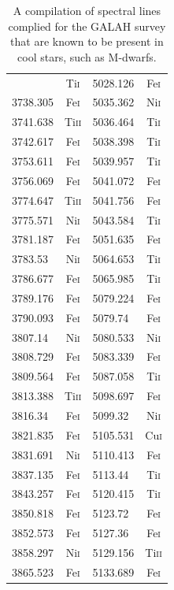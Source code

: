 \begin{longtable}[c]{|l|c|l|c|}
     \hline
     \caption{A compilation of spectral lines complied for the GALAH survey that are known to be present in cool stars, such as M-dwarfs.}
    \label{tabLineList}
    \endlastfoot
3729.807 & Ti\textsc{i} & 5028.126 & Fe\textsc{i}\\  
3738.305 & Fe\textsc{i} & 5035.362 & Ni\textsc{i}\\  
3741.638 & Ti\textsc{ii} & 5036.464 & Ti\textsc{i}\\ 
3742.617 & Fe\textsc{i} & 5038.398 & Ti\textsc{i}\\  
3753.611 & Fe\textsc{i} & 5039.957 & Ti\textsc{i}\\  
3756.069 & Fe\textsc{i} & 5041.072 & Fe\textsc{i}\\  
3774.647 & Ti\textsc{ii} & 5041.756 & Fe\textsc{i}\\ 
3775.571 & Ni\textsc{i} & 5043.584 & Ti\textsc{i}\\  
3781.187 & Fe\textsc{i} & 5051.635 & Fe\textsc{i}\\  
3783.53 & Ni\textsc{i} & 5064.653 & Ti\textsc{i}\\   
3786.677 & Fe\textsc{i} & 5065.985 & Ti\textsc{i}\\  
3789.176 & Fe\textsc{i} & 5079.224 & Fe\textsc{i}\\  
3790.093 & Fe\textsc{i} & 5079.74 & Fe\textsc{i}\\   
3807.14 & Ni\textsc{i} & 5080.533 & Ni\textsc{i}\\   
3808.729 & Fe\textsc{i} & 5083.339 & Fe\textsc{i}\\  
3809.564 & Fe\textsc{i} & 5087.058 & Ti\textsc{i}\\  
3813.388 & Ti\textsc{ii} & 5098.697 & Fe\textsc{i}\\ 
3816.34 & Fe\textsc{i} & 5099.32 & Ni\textsc{i}\\    
3821.835 & Fe\textsc{i} & 5105.531 & Cu\textsc{i}\\  
3831.691 & Ni\textsc{i} & 5110.413 & Fe\textsc{i}\\  
3837.135 & Fe\textsc{i} & 5113.44 & Ti\textsc{i}\\   
3843.257 & Fe\textsc{i} & 5120.415 & Ti\textsc{i}\\  
3850.818 & Fe\textsc{i} & 5123.72 & Fe\textsc{i}\\   
3852.573 & Fe\textsc{i} & 5127.36 & Fe\textsc{i}\\   
3858.297 & Ni\textsc{i} & 5129.156 & Ti\textsc{ii}\\ 
3865.523 & Fe\textsc{i} & 5133.689 & Fe\textsc{i}\\  

\end{longtable}
